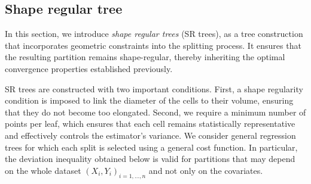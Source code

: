 \documentclass[paper=a4, fontsize=11pt]{scrartcl}
\begin{document}


\subsection{Shape regular tree}\label{s53}

 In this section, we introduce \textit{shape regular trees} (SR trees), as a tree construction that incorporates geometric constraints into the splitting process. It ensures that the resulting partition remains shape-regular, thereby inheriting the optimal convergence properties established previously.

 SR trees are constructed with two important conditions.
 First, a shape regularity condition is imposed to link the diameter of the cells to their volume, ensuring that they do not become too elongated. Second, we require a minimum number of points per leaf, which ensures that each cell remains statistically representative and effectively controls the estimator's variance. 
 We consider general regression trees for which each split is selected using a general cost function. In particular, the deviation inequality obtained below is valid for partitions that may depend on the whole dataset $(X_i,Y_i)_{i=1,\ldots,n }$ and not only on the covariates. %
\end{document}
